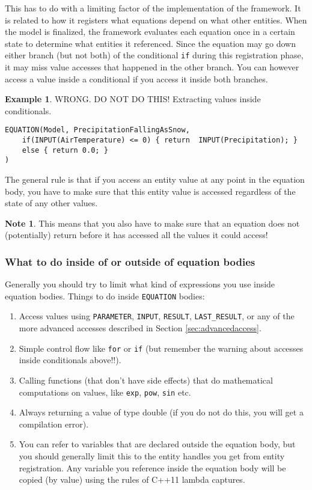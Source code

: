 \documentclass[11pt]{article}
\theoremstyle{definition}
\newtheorem{mynote}{Note}
\newenvironment{note}%
  {\begin{lrbox}{\notebox}%
   \begin{minipage}{\dimexpr\linewidth-2\fboxsep}
   \begin{mynote}}%
  {\end{mynote}%
   \end{minipage}%
   \end{lrbox}%
   \begin{trivlist}
     \item[]\colorbox{silver}{\usebox\notebox}
   \end{trivlist}}
\newtheorem{myexample}{Example}
\newenvironment{example}%
  {\begin{lrbox}{\examplebox}%
   \begin{minipage}{\dimexpr\linewidth-2\fboxsep}
   \begin{myexample}}%
  {\end{myexample}%
   \end{minipage}%
   \end{lrbox}%
   \begin{trivlist}
     \item[]\colorbox{silver}{\usebox\examplebox}
   \end{trivlist}}
\begin{document}
This has to do with a limiting factor of the implementation of the framework. It is related to how it registers what equations depend on what other entities. When the model is finalized, the framework evaluates each equation once in a certain state to determine what entities it referenced. Since the equation may go down either branch (but not both) of the conditional {\tt if} during this registration phase, it may miss value accesses that happened in the other branch. You can however access a value inside a conditional if you access it inside both branches.

\begin{example}\label{ex:simplypequations}
WRONG. DO NOT DO THIS! Extracting values inside conditionals.
\begin{lstlisting}[style=mycpp]
EQUATION(Model, PrecipitationFallingAsSnow,
	if(INPUT(AirTemperature) <= 0) { return  INPUT(Precipitation); }
	else { return 0.0; }
)
\end{lstlisting}
\end{example}

The general rule is that if you access an entity value at any point in the equation body, you have to make sure that this entity value is accessed regardless of the state of any other values.

\begin{note}
This means that you also have to make sure that an equation does not (potentially) return before it has accessed all the values it could access!
\end{note}

\subsubsection{What to do inside of or outside of equation bodies}

Generally you should try to limit what kind of expressions you use inside equation bodies. Things to do inside {\tt EQUATION} bodies:
\begin{enumerate}[i]
\item Access values using {\tt PARAMETER}, {\tt INPUT}, {\tt RESULT}, {\tt LAST\_RESULT}, or any of the more advanced accesses described in Section \ref{sec:advancedaccess}.
\item Simple control flow like {\tt for} or {\tt if} (but remember the warning about accesses inside conditionals above!!).
\item Calling functions (that don't have side effects) that do mathematical computations on values, like {\tt exp}, {\tt pow}, {\tt sin} etc.
\item Always returning a value of type double (if you do not do this, you will get a compilation error).
\item You can refer to variables that are declared outside the equation body, but you should generally limit this to the entity handles you get from entity registration. Any variable you reference inside the equation body will be copied (by value) using the rules of C++11 lambda captures.
\end{enumerate}
\end{document}
